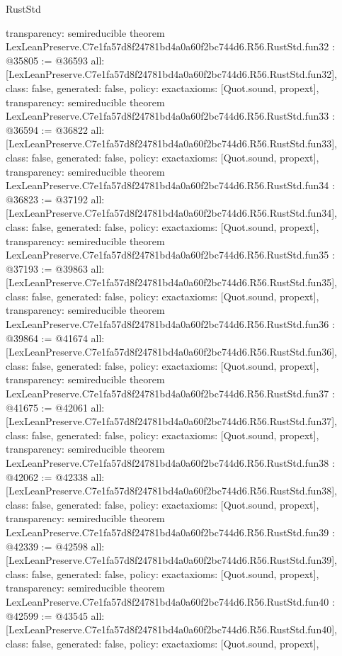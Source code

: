 \begin{lexlean}{RustStd}
\begin{coremodule}
{  transparency: semireducible
}
theorem LexLeanPreserve.C7e1fa57d8f24781bd4a0a60f2bc744d6.R56.RustStd.fun32 : @35805 := @36593 {
  all: [LexLeanPreserve.C7e1fa57d8f24781bd4a0a60f2bc744d6.R56.RustStd.fun32],
  class: false,
  generated: false,
  policy: exact{axioms: [Quot.sound, propext]},
  transparency: semireducible
}
theorem LexLeanPreserve.C7e1fa57d8f24781bd4a0a60f2bc744d6.R56.RustStd.fun33 : @36594 := @36822 {
  all: [LexLeanPreserve.C7e1fa57d8f24781bd4a0a60f2bc744d6.R56.RustStd.fun33],
  class: false,
  generated: false,
  policy: exact{axioms: [Quot.sound, propext]},
  transparency: semireducible
}
theorem LexLeanPreserve.C7e1fa57d8f24781bd4a0a60f2bc744d6.R56.RustStd.fun34 : @36823 := @37192 {
  all: [LexLeanPreserve.C7e1fa57d8f24781bd4a0a60f2bc744d6.R56.RustStd.fun34],
  class: false,
  generated: false,
  policy: exact{axioms: [Quot.sound, propext]},
  transparency: semireducible
}
theorem LexLeanPreserve.C7e1fa57d8f24781bd4a0a60f2bc744d6.R56.RustStd.fun35 : @37193 := @39863 {
  all: [LexLeanPreserve.C7e1fa57d8f24781bd4a0a60f2bc744d6.R56.RustStd.fun35],
  class: false,
  generated: false,
  policy: exact{axioms: [Quot.sound, propext]},
  transparency: semireducible
}
theorem LexLeanPreserve.C7e1fa57d8f24781bd4a0a60f2bc744d6.R56.RustStd.fun36 : @39864 := @41674 {
  all: [LexLeanPreserve.C7e1fa57d8f24781bd4a0a60f2bc744d6.R56.RustStd.fun36],
  class: false,
  generated: false,
  policy: exact{axioms: [Quot.sound, propext]},
  transparency: semireducible
}
theorem LexLeanPreserve.C7e1fa57d8f24781bd4a0a60f2bc744d6.R56.RustStd.fun37 : @41675 := @42061 {
  all: [LexLeanPreserve.C7e1fa57d8f24781bd4a0a60f2bc744d6.R56.RustStd.fun37],
  class: false,
  generated: false,
  policy: exact{axioms: [Quot.sound, propext]},
  transparency: semireducible
}
theorem LexLeanPreserve.C7e1fa57d8f24781bd4a0a60f2bc744d6.R56.RustStd.fun38 : @42062 := @42338 {
  all: [LexLeanPreserve.C7e1fa57d8f24781bd4a0a60f2bc744d6.R56.RustStd.fun38],
  class: false,
  generated: false,
  policy: exact{axioms: [Quot.sound, propext]},
  transparency: semireducible
}
theorem LexLeanPreserve.C7e1fa57d8f24781bd4a0a60f2bc744d6.R56.RustStd.fun39 : @42339 := @42598 {
  all: [LexLeanPreserve.C7e1fa57d8f24781bd4a0a60f2bc744d6.R56.RustStd.fun39],
  class: false,
  generated: false,
  policy: exact{axioms: [Quot.sound, propext]},
  transparency: semireducible
}
theorem LexLeanPreserve.C7e1fa57d8f24781bd4a0a60f2bc744d6.R56.RustStd.fun40 : @42599 := @43545 {
  all: [LexLeanPreserve.C7e1fa57d8f24781bd4a0a60f2bc744d6.R56.RustStd.fun40],
  class: false,
  generated: false,
  policy: exact{axioms: [Quot.sound, propext]},
}
\end{coremodule}
\end{lexlean}

